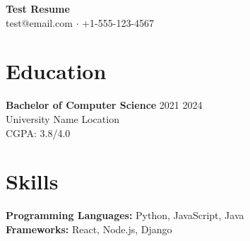 \documentclass[10pt]{article}
\begin{document}
{\LARGE \textbf{Test Resume}} \\
test@email.com $\cdot$ +1-555-123-4567 \\

\section*{\Large Education}
\textbf{Bachelor of Computer Science} \hfill 2021 \textendash{} 2024 \\
University Name \textendash{} Location \\
CGPA: 3.8/4.0

\section*{\Large Skills}
\textbf{Programming Languages:} Python, JavaScript, Java \\
\textbf{Frameworks:} React, Node.js, Django
\end{document}
